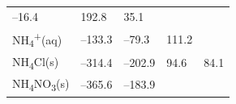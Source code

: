 \documentclass[
  9pt,
]{extbook}
\theoremstyle{definition}
\theoremstyle{definition}
\theoremstyle{definition}
\theoremstyle{remark}
\begin{document}
\begin{longtable}[]{@{}lllll@{}}
\begin{minipage}[t]{0.20\columnwidth}
--16.4\strut
\end{minipage} & \begin{minipage}[t]{0.18\columnwidth}\raggedright
192.8\strut
\end{minipage} & \begin{minipage}[t]{0.18\columnwidth}\raggedright
35.1\strut
\end{minipage}\tabularnewline
\begin{minipage}[t]{0.10\columnwidth}\raggedright
NH\textsubscript{4}\textsuperscript{+}(aq)\strut
\end{minipage} & \begin{minipage}[t]{0.19\columnwidth}\raggedright
--133.3\strut
\end{minipage} & \begin{minipage}[t]{0.20\columnwidth}\raggedright
--79.3\strut
\end{minipage} & \begin{minipage}[t]{0.18\columnwidth}\raggedright
111.2\strut
\end{minipage} & \begin{minipage}[t]{0.18\columnwidth}\raggedright
\strut
\end{minipage}\tabularnewline
\begin{minipage}[t]{0.10\columnwidth}\raggedright
NH\textsubscript{4}Cl(s)\strut
\end{minipage} & \begin{minipage}[t]{0.19\columnwidth}\raggedright
--314.4\strut
\end{minipage} & \begin{minipage}[t]{0.20\columnwidth}\raggedright
--202.9\strut
\end{minipage} & \begin{minipage}[t]{0.18\columnwidth}\raggedright
94.6\strut
\end{minipage} & \begin{minipage}[t]{0.18\columnwidth}\raggedright
84.1\strut
\end{minipage}\tabularnewline
\begin{minipage}[t]{0.10\columnwidth}\raggedright
NH\textsubscript{4}NO\textsubscript{3}(s)\strut
\end{minipage} & \begin{minipage}[t]{0.19\columnwidth}\raggedright
--365.6\strut
\end{minipage} & \begin{minipage}[t]{0.20\columnwidth}\raggedright
--183.9\strut
\end{minipage} & \begin{minipage}[t]{0.18\columnwidth}\raggedright

\end{minipage}
\end{longtable}
\end{document}
